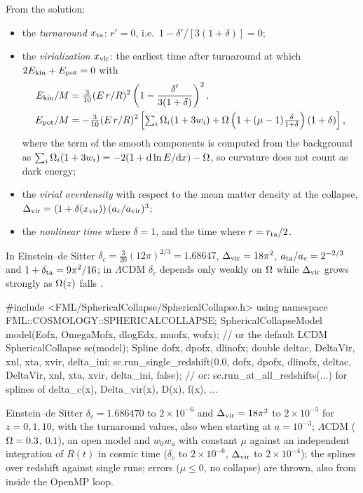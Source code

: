From the solution:
\begin{itemize}
\item the \emph{turnaround} $x_{\rm ta}$: $r'=0$, i.e.\ $1-\delta'/[3(1+\delta)]=0$;
\item the \emph{virialization} $x_{\rm vir}$: the earliest time after turnaround at which $2E_{\rm kin}+E_{\rm pot}=0$ with
      \begin{align}
      E_{\rm kin}/M&=\tfrac3{10}(E\,r/R)^2\left(1-\frac{\delta'}{3(1+\delta)}\right)^2,\\
      E_{\rm pot}/M&=-\tfrac3{10}(E\,r/R)^2\left[\textstyle\sum_i\Omega_i(1+3w_i)+\Omega\left(1+(\mu-1)\frac{\delta}{1+\delta}\right)(1+\delta)\right],
      \end{align}
      where the term of the smooth components is computed from the background as
      $\sum_i\Omega_i(1+3w_i)=-2(1+\mathrm{d}\ln E/\mathrm{d} x)-\Omega$, so curvature does not count as dark energy;
\item the \emph{virial overdensity} with respect to the mean matter density at the collapse,
      $\Delta_{\rm vir}=(1+\delta(x_{\rm vir}))\,(a_c/a_{\rm vir})^3$;
\item the \emph{nonlinear time} where $\delta=1$, and the time where $r=r_{\rm ta}/2$.
\end{itemize}
In Einstein--de Sitter $\delta_c=\frac3{20}(12\pi)^{2/3}=1.68647$, $\Delta_{\rm vir}=18\pi^2$,
$a_{\rm ta}/a_c=2^{-2/3}$ and $1+\delta_{\rm ta}=9\pi^2/16$; in $\Lambda$CDM $\delta_c$ depends only weakly on $\Omega$ while
$\Delta_{\rm vir}$ grows strongly as $\Omega(z)$ falls \cite{CooraySheth2002}.

\begin{cppcode}
#include <FML/SphericalCollapse/SphericalCollapse.h>
using namespace FML::COSMOLOGY::SPHERICALCOLLAPSE;
SphericalCollapseModel model(Eofx, OmegaMofx, dlogEdx, muofx, wofx);   // or the default LCDM
SphericalCollapse sc(model);
Spline dofx, dpofx, dlinofx;
double deltac, DeltaVir, xnl, xta, xvir, delta_ini;
sc.run_single_redshift(0.0, dofx, dpofx, dlinofx,
                       deltac, DeltaVir, xnl, xta, xvir, delta_ini, false);
// or: sc.run_at_all_redshifts(...) for splines of delta_c(x), Delta_vir(x), D(x), f(x), ...
\end{cppcode}

\begin{validation}
Einstein--de Sitter $\delta_c=1.686470$ to $2\times10^{-6}$ and $\Delta_{\rm vir}=18\pi^2$ to $2\times10^{-5}$ for
$z=0,1,10$, with the turnaround values, also when starting at $a=10^{-3}$; $\Lambda$CDM ($\Omega=0.3$, $0.1$), an open model
and $w_0w_a$ with constant $\mu$ against an independent integration of $R(t)$ in cosmic time ($\delta_c$ to
$2\times10^{-6}$, $\Delta_{\rm vir}$ to $2\times10^{-4}$); the splines over redshift against single runs; errors
($\mu\le0$, no collapse) are thrown, also from inside the OpenMP loop.
\end{validation}

